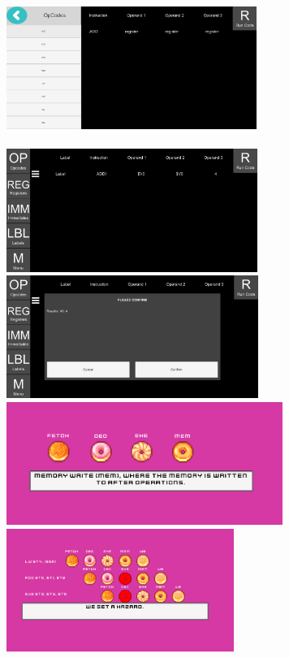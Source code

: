 \documentclass[12pt]{article}
\begin{document}
	\includegraphics[height=4cm]{MIPSSimulatorProgress.png}\\\\
	\includegraphics[height=4cm]{MIPSSimulatorReady.png}
	\includegraphics[height=4cm]{MIPSSimulatorRun.png}\\
	\includegraphics[height=4cm]{PipelineBakeryTut.png}
	\includegraphics[height=4cm]{PipelineBakeryTut2.png}\\
\end{document}
